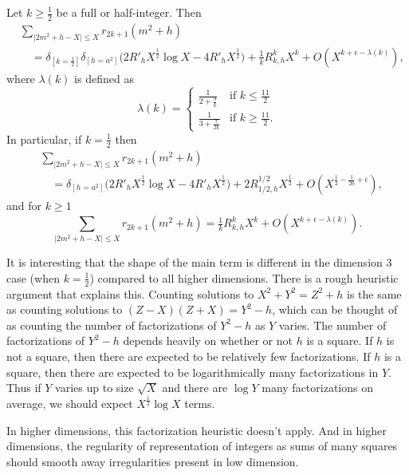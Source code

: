 \begin{theorem}\label{thm:hyp:sharp_theorem_full}
  Let $k \geq \frac{1}{2}$ be a full or half-integer.
  Then
  \begin{align}
    &\sum_{\lvert 2m^2 + h - X \rvert \leq X} r_{2k+1}(m^2 + h) \\
    &\quad= \delta_{[k = \frac{1}{2}]} \delta_{[h = a^2]} \bigg( 2 R'_h X^{\frac{1}{2}}
  \log X -4 R'_h X^{\frac{1}{2}} \bigg) + \tfrac{1}{k} R_{k, h}^k X^{k} + O(X^{k +
\epsilon - \lambda(k)}),
  \end{align}
  where $\lambda(k)$ is defined as
  \begin{equation}
    \lambda(k) =
    \begin{cases}
      \frac{1}{2 + \frac{9}{k}} & \text{if } k \leq \frac{11}{2} \\
      \frac{1}{3 + \frac{7}{2k}} & \text{if } k \geq \frac{11}{2}.
    \end{cases}
  \end{equation}
  In particular, if $k = \frac{1}{2}$ then
  \begin{align}
    &\sum_{\lvert 2m^2 + h - X \rvert \leq X} r_{2k+1}(m^2 + h) \\
    &\quad = \delta_{[h = a^2]} \bigg( 2 R'_h X^{\frac{1}{2}} \log X -4 R'_h
  X^{\frac{1}{2}} \bigg) + 2R_{1/2, h}^{1/2} X^{\frac{1}{2}} + O(X^{\frac{1}{2} -
\frac{1}{20} + \epsilon}),
  \end{align}
  and for $k \geq 1$
  \begin{equation}
    \sum_{\lvert 2m^2 + h - X \rvert \leq X} r_{2k+1}(m^2 + h)  = \tfrac{1}{k} R_{k, h}^k
    X^{k} + O(X^{k + \epsilon - \lambda(k)}).
  \end{equation}
\end{theorem}


\begin{remark}
  It is interesting that the shape of the main term is different in the dimension $3$ case
  (when $k = \frac{1}{2}$) compared to all higher dimensions.
  There is a rough heuristic argument that explains this.
  Counting solutions to $X^2 + Y^2 = Z^2 + h$ is the same as counting solutions to
  $(Z-X)(Z+X) = Y^2 - h$, which can be thought of as counting the number of factorizations
  of $Y^2 - h$ as $Y$ varies.
  The number of factorizations of $Y^2 - h$ depends heavily on whether or not $h$ is a
  square.
  If $h$ is not a square, then there are expected to be relatively few factorizations.
  If $h$ is a square, then there are expected to be logarithmically many factorizations in
  $Y$.
  Thus if $Y$ varies up to size $\sqrt X$ and there are $\log Y$ many factorizations on
  average, we should expect $X^{\frac{1}{2}} \log X$ terms.


  In higher dimensions, this factorization heuristic doesn't apply.
  And in higher dimensions, the regularity of representation of integers as sums of many
  squares should smooth away irregularities present in low dimension.
\end{remark}





